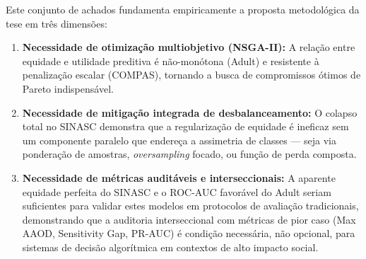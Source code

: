 \begin{table}[H]
    \centering
    \caption{Síntese comparativa dos três cenários experimentais.}
    \vspace{2mm}
    \label{tab:synthesis}
\end{table}

Este conjunto de achados fundamenta empiricamente a proposta metodológica da tese em três dimensões:

\begin{enumerate}
    \item \textbf{Necessidade de otimização multiobjetivo (NSGA-II):} A relação entre equidade e utilidade preditiva é não-monótona (Adult) e resistente à penalização escalar (COMPAS), tornando a busca de compromissos ótimos de Pareto indispensável.
    \item \textbf{Necessidade de mitigação integrada de desbalanceamento:} O colapso total no SINASC demonstra que a regularização de equidade é ineficaz sem um componente paralelo que endereça a assimetria de classes --- seja via ponderação de amostras, \textit{oversampling} focado, ou função de perda composta.
    \item \textbf{Necessidade de métricas auditáveis e interseccionais:} A aparente equidade perfeita do SINASC e o ROC-AUC favorável do Adult seriam suficientes para validar estes modelos em protocolos de avaliação tradicionais, demonstrando que a auditoria interseccional com métricas de pior caso (Max AAOD, Sensitivity Gap, PR-AUC) é condição necessária, não opcional, para sistemas de decisão algorítmica em contextos de alto impacto social.
\end{enumerate}

